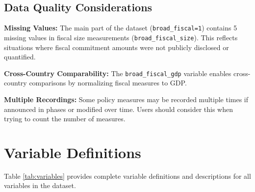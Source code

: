 \documentclass[12pt]{article}
\begin{document}
\subsection{Data Quality Considerations}

\textbf{Missing Values:} The main part of the dataset (\texttt{broad\_fiscal=1}) contains 5 missing values in fiscal size measurements (\texttt{broad\_fiscal\_size}). This reflects situations where fiscal commitment amounts were not publicly disclosed or quantified.

\textbf{Cross-Country Comparability:} The \texttt{broad\_fiscal\_gdp} variable enables cross-country comparisons by normalizing fiscal measures to GDP. 

\textbf{Multiple Recordings:} Some policy measures may be recorded multiple times if announced in phases or modified over time. Users should consider this when trying to count the number of measures.
\newpage
\section{Variable Definitions}

Table \ref{tab:variables} provides complete variable definitions and descriptions for all variables in the dataset.
\end{document}
